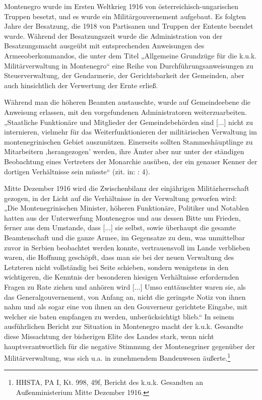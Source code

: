 Montenegro wurde im Ersten Weltkrieg 1916 von österreichisch-ungarischen Truppen besetzt, und es wurde ein Militärgouvernement aufgebaut. Es folgten Jahre der Besatzung, die 1918 von Partisanen und Truppen der Entente beendet wurde. Während der Besatzungszeit wurde die Administration von der Besatzungsmacht ausgeübt mit entsprechenden Anweisungen des Armeeoberkommandos, die unter dem Titel „Allgemeine Grundzüge für die k.u.k. Militärverwaltung in Montenegro“ eine Reihe von Durchführungsanweisungen zu Steuerverwaltung, der Gendarmerie, der Gerichtsbarkeit der Gemeinden, aber auch hinsichtlich der Verwertung der Ernte erließ.\par
Während man die höheren Beamten austauschte, wurde auf Gemeindeebene die Anweisung erlassen, mit den vorgefundenen Administratoren weiterzuarbeiten. „Staatliche Funktionäre und Mitglieder der Gemeindebehörden sind [...] nicht zu internieren, vielmehr für das Weiterfunktionieren der militärischen Verwaltung im montenegrinischen Gebiet auszunützen. Einerseits sollten Stammeshäuptlinge zu Mitarbeitern ‚herangezogen’ werden, ihre Ämter aber nur unter der ständigen Beobachtung eines Vertreters der Monarchie ausüben, der ein genauer Kenner der dortigen Verhältnisse sein müsste“ (zit. in: \cite{scheer} : 4).\par
Mitte Dezember 1916 wird die Zwischenbilanz der einjährigen Militärherrschaft gezogen, in der Licht auf die Verhältnisse in der Verwaltung geworfen wird:\\
„Die Montenegrinischen Minister, höheren Funktionäre, Politiker und Notablen hatten aus der Unterwerfung Montenegros und aus dessen Bitte um Frieden, ferner aus dem Umstande, dass [...] sie selbst, sowie überhaupt die gesamte Beamtenschaft und die ganze Armee, im Gegensatze zu dem, was unmittelbar zuvor in Serbien beobachtet werden konnte, vertrauensvoll im Lande verblieben waren, die Hoffnung geschöpft, dass man sie bei der neuen Verwaltung des Letzteren nicht vollständig bei Seite schieben, sondern wenigstens in den wichtigeren, die Kenntnis der besonderen hiesigen Verhältnisse erfordernden Fragen zu Rate ziehen und anhören wird [...] Umso enttäuschter waren sie, als das Generalgouvernement, von Anfang an, nicht die geringste Notiz von ihnen nahm und als sogar eine von ihnen an den Gouverneur gerichtete Eingabe, mit welcher sie baten empfangen zu werden, unberücksichtigt blieb.“ In seinem ausführlichen Bericht zur Situation in Montenegro macht der k.u.k. Gesandte diese Missachtung der bisherigen Elite des Landes stark, wenn nicht hauptverantwortlich für die negative Stimmung der Montenegriner gegenüber der Militärverwaltung, was sich u.a. in zunehmendem Bandenwesen äußerte.\footnote{HHSTA, PA I, Kt. 998, 49f, Bericht des k.u.k. Gesandten an Außenministerium Mitte Dezember 1916.}\par
